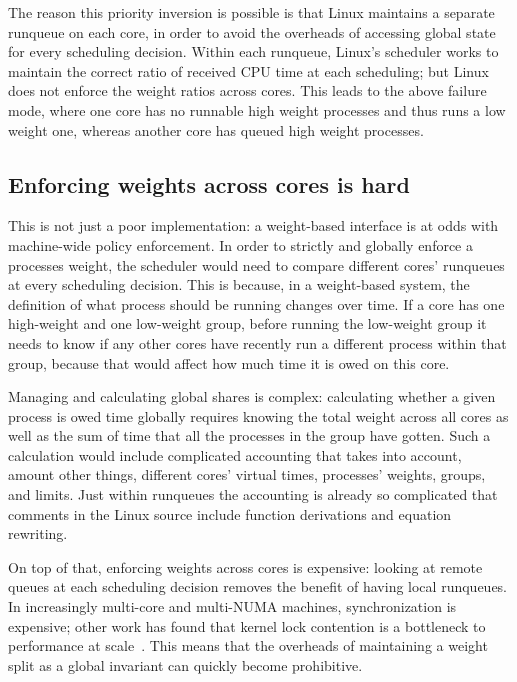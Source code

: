 The reason this priority inversion is possible is that Linux maintains a
separate runqueue on each core, in order to avoid the overheads of accessing
global state for every scheduling decision. Within each runqueue, Linux's
scheduler works to maintain the correct ratio of received CPU time at each
scheduling; but Linux does not enforce the weight ratios across cores. This
leads to the above failure mode, where one core has no runnable high weight
processes and thus runs a low weight one, whereas another core has queued high
weight processes.

\subsection{Enforcing weights across cores is
hard}\label{ss:problem:cross-core-hard}

This is not just a poor implementation: a weight-based interface is at odds with
machine-wide policy enforcement. In order to strictly and globally enforce a
processes weight, the scheduler would need to compare different cores' runqueues
at every scheduling decision. This is because, in a weight-based system, the
definition of what process should be running changes over time. If a core has
one high-weight and one low-weight group, before running the low-weight group it
needs to know if any other cores have recently run a different process within
that group, because that would affect how much time it is owed on this core.

Managing and calculating global shares is complex: calculating whether a given
process is owed time globally requires knowing the total weight across all cores
as well as the sum of time that all the processes in the group have gotten. Such
a calculation would include complicated accounting that takes into account,
amount other things, different cores' virtual times, processes' weights, groups,
and limits. Just within runqueues the accounting is already so complicated that
comments in the Linux source include function derivations and equation
rewriting.

On top of that, enforcing weights across cores is expensive: looking at remote
queues at each scheduling decision removes the benefit of having local
runqueues. In increasingly multi-core and multi-NUMA machines, synchronization
is expensive; other work has found that kernel lock contention is a bottleneck
to performance at scale~\cite{afaas}. This means that the overheads of
maintaining a weight split as a global invariant can quickly become prohibitive.


